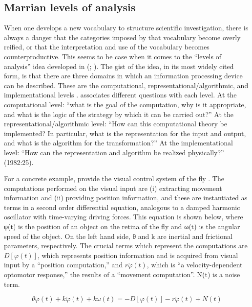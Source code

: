 \subsection{Marrian levels of analysis}

When one develops a new vocabulary to structure scientific investigation, there is always a danger that the categories imposed by that vocabulary become overly reified, or that the interpretation and use of the vocabulary becomes counterproductive. This seems to be case when it comes to the “levels of analysis” idea developed in (\citealt{Marr1982}; \citealt{MarrPoggio1977}). The gist of the idea, in its most widely cited form, is that there are three domains in which an information processing device can be described. These are the computational, representational/algorithmic, and implementational levels \citep{Marr1982}. \citet{Marr1982} associates different questions with each level. At the computational level: “what is the goal of the computation, why is it appropriate, and what is the logic of the strategy by which it can be carried out?” At the representational/algorithmic level: “How can this computational theory be implemented? In particular, what is the representation for the input and output, and what is the algorithm for the transformation?” At the implementational level: “How  can the representation and algorithm be realized physically?” (1982:25).

  For a concrete example, \citet{MarrPoggio1977} provide the visual control system of the fly \citep{ReichardtPoggio1976}. The computations performed on the visual input are (i) extracting movement information and (ii) providing position information, and these are instantiated as terms in a second order differential equation, analogous to a damped harmonic oscillator with time-varying driving forces. This equation is shown below, where  φ(t) is the position of an object on the retina of the fly and ω(t) is the angular speed of the object. On the left hand side, θ and k are inertial and frictional parameters, respectively. The crucial terms which represent the computations are  $D\left[\varphi \left(t\right)\right]$, which represents position information and is acquired from visual input by a “position computation,” and  $r\acute{{\varphi} }\left(t\right)$, which is “a velocity-dependent optomotor response,” the results of a “movement computation”. N(t) is a noise term.

\begin{equation*}
\theta \acute{{\varphi} }\left(t\right)+k\acute{{\varphi} }\left(t\right)+\mathit{k\omega} \left(t\right)=-D\left[\varphi \left(t\right)\right]-r\acute{{\varphi} }\left(t\right)+N\left(t\right)
\end{equation*}

